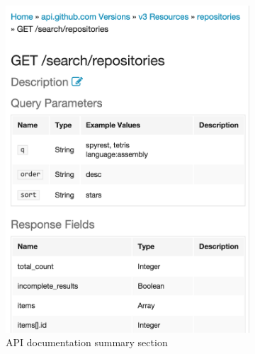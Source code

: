 \documentclass[11pt,oneside]{book}
\begin{document}
\begin{figure}[!tbh]
  \begin{mdframed}
    \centering
    \begin{subfigure}[t]{0.45\textwidth}
      \includegraphics[width=\linewidth]{left.png}
      \caption{API documentation summary section}
      \label{fig:summary}
    \end{subfigure}
    \begin{subfigure}[t]{0.45\textwidth}

\end{subfigure}
\end{mdframed}
\end{figure}
\end{document}
